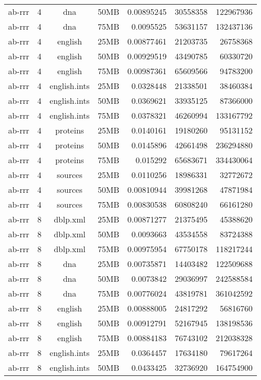 \begin{table}[h]
\begin{center}
\begin{tabular}{ccccrrr}
ab-rrr & 4 & dna & 50MB & 0.00895245 & 30558358 & 122967936 \\
ab-rrr & 4 & dna & 75MB & 0.0095525 & 53631157 & 132437136 \\
ab-rrr & 4 & english & 25MB & 0.00877461 & 21203735 & 26758368 \\
ab-rrr & 4 & english & 50MB & 0.00929519 & 43490785 & 60330720 \\
ab-rrr & 4 & english & 75MB & 0.00987361 & 65609566 & 94783200 \\
ab-rrr & 4 & english.ints & 25MB & 0.0328448 & 21338501 & 38460384 \\
ab-rrr & 4 & english.ints & 50MB & 0.0369621 & 33935125 & 87366000 \\
ab-rrr & 4 & english.ints & 75MB & 0.0378321 & 46260994 & 133167792 \\
ab-rrr & 4 & proteins & 25MB & 0.0140161 & 19180260 & 95131152 \\
ab-rrr & 4 & proteins & 50MB & 0.0145896 & 42661498 & 236294880 \\
ab-rrr & 4 & proteins & 75MB & 0.015292 & 65683671 & 334430064 \\
ab-rrr & 4 & sources & 25MB & 0.0110256 & 18986331 & 32772672 \\
ab-rrr & 4 & sources & 50MB & 0.00810944 & 39981268 & 47871984 \\
ab-rrr & 4 & sources & 75MB & 0.00830538 & 60808240 & 66161280 \\
ab-rrr & 8 & dblp.xml & 25MB & 0.00871277 & 21375495 & 45388620 \\
ab-rrr & 8 & dblp.xml & 50MB & 0.0093663 & 43534558 & 83724388 \\
ab-rrr & 8 & dblp.xml & 75MB & 0.00975954 & 67750178 & 118217244 \\
ab-rrr & 8 & dna & 25MB & 0.00735871 & 14403482 & 122509688 \\
ab-rrr & 8 & dna & 50MB & 0.0073842 & 29036997 & 242588584 \\
ab-rrr & 8 & dna & 75MB & 0.00776024 & 43819781 & 361042592 \\
ab-rrr & 8 & english & 25MB & 0.00888005 & 24817292 & 56816760 \\
ab-rrr & 8 & english & 50MB & 0.00912791 & 52167945 & 138198536 \\
ab-rrr & 8 & english & 75MB & 0.00884183 & 76743102 & 212038328 \\
ab-rrr & 8 & english.ints & 25MB & 0.0364457 & 17634180 & 79617264 \\
ab-rrr & 8 & english.ints & 50MB & 0.0433425 & 32736920 & 164754900 \\

\end{tabular}
\end{center}
\end{table}
